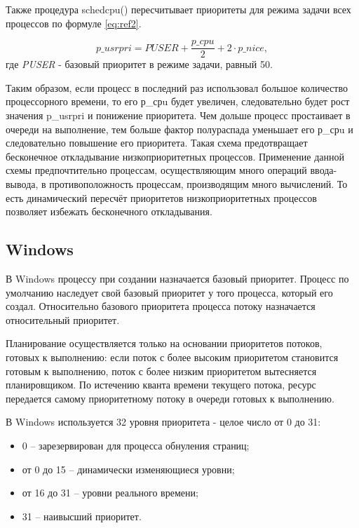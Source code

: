 Также процедура schedcpu() пересчитывает приоритеты для режима задачи
всех процессов по формуле \ref{eq:ref2}.

\begin{equation}
	\label{eq:ref2}
	p\_usrpri = PUSER + \frac{p\_cpu}{2} + 2 \cdot p\_nice ,
\end{equation}где \textit{PUSER} - базовый приоритет в режиме задачи, равный 50.

Таким образом, если процесс в последний раз использовал большое количество процессорного времени, то его р\_срu будет увеличен, следовательно будет рост значения p\_usrpri и понижение приоритета.  Чем дольше процесс простаивает в очереди на выполнение, тем больше фактор полураспада уменьшает его р\_срu и следовательно повышение его приоритета. Такая схема предотвращает бесконечное откладывание низкоприоритетных процессов. Применение данной схемы предпочтительно процессам, осуществляющим много операций ввода-вывода, в противоположность процессам, производящим много вычислений. То есть динамический пересчёт приоритетов низкоприоритетных процессов позволяет избежать бесконечного откладывания.


\subsection{Windows}

В Windows процессу при создании назначается базовый приоритет. Процесс по умолчанию наследует свой базовый приоритет у того процесса, который его создал. Относительно базового приоритета процесса потоку назначается относительный приоритет. 

Планирование осуществляется только на основании приоритетов потоков, готовых к выполнению: если поток с более высоким приоритетом становится готовым к выполнению, поток с более низким приоритетом вытесняется планировщиком. По истечению кванта времени текущего потока, ресурс передается самому приоритетному потоку в очереди готовых к выполнению.

В Windows используется 32 уровня приоритета - целое число от 0 до 31:
\begin{itemize}[label*=---]
	\item 0 -- зарезервирован для процесса обнуления страниц;
	\item от 0 до 15 -- динамически изменяющиеся уровни;
	\item от 16 до 31 -- уровни реального времени;
	\item 31 -- наивысший приоритет.
\end{itemize}

